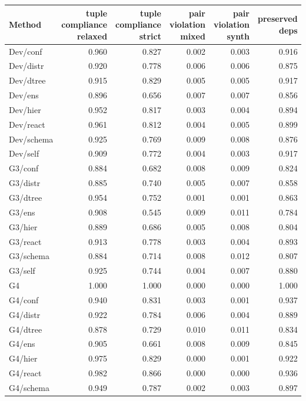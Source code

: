\begin{table}[t]
\centering
\scriptsize
\setlength\tabcolsep{3pt}
\begin{tabular}{lrrrrr}
\toprule
\textbf{Method} & \textbf{tuple compliance relaxed} & \textbf{tuple compliance strict} & \textbf{pair violation mixed} & \textbf{pair violation synth} & \textbf{preserved deps} \\
\midrule
Dev/conf & 0.960 & 0.827 & 0.002 & 0.003 & 0.916 \\
Dev/distr & 0.920 & 0.778 & 0.006 & 0.006 & 0.875 \\
Dev/dtree & 0.915 & 0.829 & 0.005 & 0.005 & 0.917 \\
Dev/ens & 0.896 & 0.656 & 0.007 & 0.007 & 0.856 \\
Dev/hier & 0.952 & 0.817 & 0.003 & 0.004 & 0.894 \\
Dev/react & 0.961 & 0.812 & 0.004 & 0.005 & 0.899 \\
Dev/schema & 0.925 & 0.769 & 0.009 & 0.008 & 0.876 \\
Dev/self & 0.909 & 0.772 & 0.004 & 0.003 & 0.917 \\
G3/conf & 0.884 & 0.682 & 0.008 & 0.009 & 0.824 \\
G3/distr & 0.885 & 0.740 & 0.005 & 0.007 & 0.858 \\
G3/dtree & 0.954 & 0.752 & 0.001 & 0.001 & 0.863 \\
G3/ens & 0.908 & 0.545 & 0.009 & 0.011 & 0.784 \\
G3/hier & 0.889 & 0.686 & 0.005 & 0.008 & 0.804 \\
G3/react & 0.913 & 0.778 & 0.003 & 0.004 & 0.893 \\
G3/schema & 0.884 & 0.714 & 0.008 & 0.012 & 0.807 \\
G3/self & 0.925 & 0.744 & 0.004 & 0.007 & 0.880 \\
G4 & 1.000 & 1.000 & 0.000 & 0.000 & 1.000 \\
G4/conf & 0.940 & 0.831 & 0.003 & 0.001 & 0.937 \\
G4/distr & 0.922 & 0.784 & 0.006 & 0.004 & 0.889 \\
G4/dtree & 0.878 & 0.729 & 0.010 & 0.011 & 0.834 \\
G4/ens & 0.905 & 0.661 & 0.008 & 0.009 & 0.845 \\
G4/hier & 0.975 & 0.829 & 0.000 & 0.001 & 0.922 \\
G4/react & 0.982 & 0.866 & 0.000 & 0.000 & 0.936 \\
G4/schema & 0.949 & 0.787 & 0.002 & 0.003 & 0.897 \\

\end{tabular}
\end{table}
